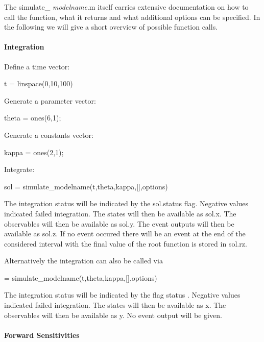 The simulate\+\_\+ {\itshape modelname}.m itself carries extensive documentation on how to call the function, what it returns and what additional options can be specified. In the following we will give a short overview of possible function calls.

\paragraph*{Integration}

Define a time vector\+: \begin{DoxyVerb}t = linspace(0,10,100)
\end{DoxyVerb}


Generate a parameter vector\+: \begin{DoxyVerb}theta = ones(6,1);
\end{DoxyVerb}


Generate a constants vector\+: \begin{DoxyVerb}kappa = ones(2,1);
\end{DoxyVerb}


Integrate\+: \begin{DoxyVerb}sol = simulate_modelname(t,theta,kappa,[],options)
\end{DoxyVerb}


The integration status will be indicated by the {\ttfamily sol.\+status} flag. Negative values indicated failed integration. The states will then be available as sol.\+x. The observables will then be available as {\ttfamily sol.\+y}. The event outputs will then be available as {\ttfamily sol.\+z}. If no event occured there will be an event at the end of the considered interval with the final value of the root function is stored in {\ttfamily sol.\+rz}.

Alternatively the integration can also be called via \begin{DoxyVerb}[status,t,x,y] = simulate_modelname(t,theta,kappa,[],options)
\end{DoxyVerb}


The integration status will be indicated by the flag {\ttfamily status} . Negative values indicated failed integration. The states will then be available as {\ttfamily x}. The observables will then be available as {\ttfamily y}. No event output will be given.

\paragraph*{Forward Sensitivities}

